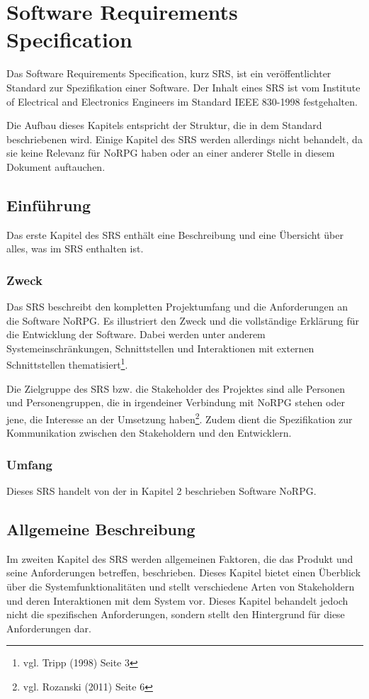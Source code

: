 \chapter{Software Requirements Specification}
	Das Software Requirements Specification, kurz SRS, ist ein veröffentlichter Standard zur Spezifikation einer Software. Der Inhalt eines SRS ist vom Institute of Electrical and Electronics Engineers im Standard IEEE 830-1998 festgehalten.
	
	Die Aufbau dieses Kapitels entspricht der Struktur, die in dem Standard beschriebenen wird. Einige Kapitel des SRS werden allerdings nicht behandelt, da sie keine Relevanz für NoRPG haben oder an einer anderer Stelle in diesem Dokument auftauchen.
	
\section{Einführung}
	Das erste Kapitel des SRS enthält eine Beschreibung und eine Übersicht über alles, was im SRS enthalten ist.
	
	\subsection{Zweck}
		Das SRS beschreibt den kompletten Projektumfang und die Anforderungen an die Software NoRPG. Es illustriert den Zweck und die vollständige Erklärung für die Entwicklung der Software. Dabei werden unter anderem Systemeinschränkungen, Schnittstellen und Interaktionen mit externen Schnittstellen thematisiert\footnote{vgl. Tripp \cite{srsIEEE}(1998) Seite 3}. 
	
		Die Zielgruppe des SRS bzw. die Stakeholder des Projektes sind alle Personen und Personengruppen, die in irgendeiner Verbindung mit NoRPG stehen oder jene, die Interesse an der Umsetzung haben\footnote{vgl. Rozanski \cite{rozanski2011}(2011) Seite 6}. Zudem dient die Spezifikation zur Kommunikation zwischen den Stakeholdern und den Entwicklern.
		
	\subsection{Umfang}
		Dieses SRS handelt von der in Kapitel 2 beschrieben Software NoRPG. 
		
\section{Allgemeine Beschreibung}
	Im zweiten Kapitel des SRS werden allgemeinen Faktoren, die das Produkt und seine Anforderungen betreffen, beschrieben. Dieses Kapitel bietet einen Überblick über die Systemfunktionalitäten und stellt verschiedene Arten von Stakeholdern und deren Interaktionen mit dem System vor. Dieses Kapitel behandelt jedoch nicht die spezifischen Anforderungen, sondern stellt den Hintergrund für diese Anforderungen dar. 

